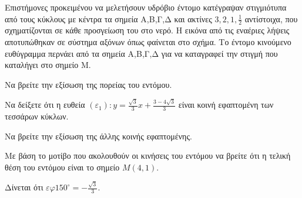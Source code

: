 Επιστήμονες προκειμένου να μελετήσουν υδρόβιο έντομο κατέγραψαν στιγμιότυπα από τους κύκλους με κέντρα τα σημεία Α,Β,Γ,Δ και ακτίνες $3,2,1,\frac{1}{2}$ αντίστοιχα, που σχηματίζονται σε κάθε προσγείωση του στο νερό. Η εικόνα από τις εναέριες λήψεις αποτυπώθηκαν σε σύστημα αξόνων όπως φαίνεται στο σχήμα. Το έντομο κινούμενο ευθύγραμμα περνάει από τα σημεία Α,Β,Γ,Δ για να καταγραφεί την στιγμή που καταλήγει στο σημείο Μ.

\begin{alist}
    \item Να βρείτε την εξίσωση της πορείας του εντόμου. 
    \item
    \begin{rlist}
        \item Να δείξετε ότι η ευθεία $(\varepsilon_1): y = \frac{\sqrt{3}}{3}x + \frac{3-4\sqrt{3}}{3}$ είναι κοινή εφαπτομένη των τεσσάρων κύκλων. 
        \item Να βρείτε την εξίσωση της άλλης κοινής εφαπτομένης. 
    \end{rlist}
    \item Με βάση το μοτίβο που ακολουθούν οι κινήσεις του εντόμου να βρείτε ότι η τελική θέση του εντόμου είναι το σημείο $M(4,1)$. 
\end{alist}
Δίνεται ότι $\varepsilon\varphi 150^\circ = -\frac{\sqrt{3}}{3}$.